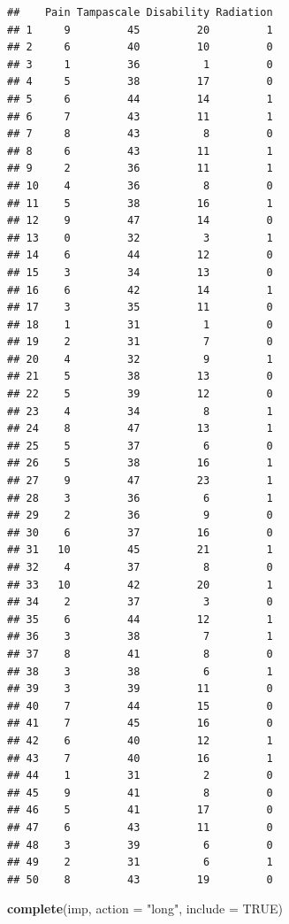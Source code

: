 \documentclass[]{book}
\newenvironment{Shaded}{\begin{snugshade}}{\end{snugshade}}
\newcommand{\KeywordTok}[1]{\textcolor[rgb]{0.13,0.29,0.53}{\textbf{#1}}}
\newcommand{\DataTypeTok}[1]{\textcolor[rgb]{0.13,0.29,0.53}{#1}}
\newcommand{\StringTok}[1]{\textcolor[rgb]{0.31,0.60,0.02}{#1}}
\newcommand{\OtherTok}[1]{\textcolor[rgb]{0.56,0.35,0.01}{#1}}
\newcommand{\NormalTok}[1]{#1}
\begin{document}
\begin{verbatim}
##    Pain Tampascale Disability Radiation
## 1     9         45         20         1
## 2     6         40         10         0
## 3     1         36          1         0
## 4     5         38         17         0
## 5     6         44         14         1
## 6     7         43         11         1
## 7     8         43          8         0
## 8     6         43         11         1
## 9     2         36         11         1
## 10    4         36          8         0
## 11    5         38         16         1
## 12    9         47         14         0
## 13    0         32          3         1
## 14    6         44         12         0
## 15    3         34         13         0
## 16    6         42         14         1
## 17    3         35         11         0
## 18    1         31          1         0
## 19    2         31          7         0
## 20    4         32          9         1
## 21    5         38         13         0
## 22    5         39         12         0
## 23    4         34          8         1
## 24    8         47         13         1
## 25    5         37          6         0
## 26    5         38         16         1
## 27    9         47         23         1
## 28    3         36          6         1
## 29    2         36          9         0
## 30    6         37         16         0
## 31   10         45         21         1
## 32    4         37          8         0
## 33   10         42         20         1
## 34    2         37          3         0
## 35    6         44         12         1
## 36    3         38          7         1
## 37    8         41          8         0
## 38    3         38          6         1
## 39    3         39         11         0
## 40    7         44         15         0
## 41    7         45         16         0
## 42    6         40         12         1
## 43    7         40         16         1
## 44    1         31          2         0
## 45    9         41          8         0
## 46    5         41         17         0
## 47    6         43         11         0
## 48    3         39          6         0
## 49    2         31          6         1
## 50    8         43         19         0
\end{verbatim}

\begin{Shaded}
\begin{Highlighting}[]
\KeywordTok{complete}\NormalTok{(imp, }\DataTypeTok{action =} \StringTok{"long"}\NormalTok{, }\DataTypeTok{include =} \OtherTok{TRUE}\NormalTok{)}
\end{Highlighting}
\end{Shaded}
\end{document}
